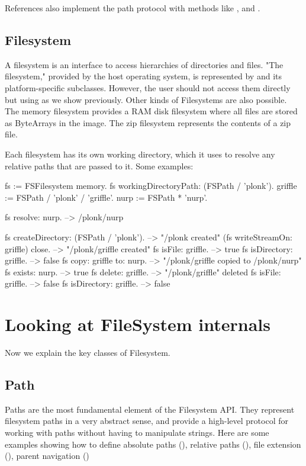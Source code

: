 \documentclass[a4paper,10pt,twoside]{book}
\begin{document}
References also implement the path protocol with methods like \ct{/},  and .


\subsection{Filesystem}

A filesystem is an interface to access hierarchies of directories and files. "The filesystem," provided by the host operating system, is represented by  and its platform-specific subclasses. However, the user should not access them directly but using  as we show previously. Other kinds of Filesystems are also possible. The memory filesystem provides a RAM disk filesystem where all files are stored as ByteArrays in the image. The zip filesystem represents the contents of a zip file.

Each filesystem has its own working directory, which it uses to resolve any relative paths that are passed to it. Some examples:

\begin{code}{}
fs := FSFilesystem memory.
fs workingDirectoryPath: (FSPath / 'plonk').
griffle := FSPath / 'plonk' / 'griffle'.
nurp := FSPath * 'nurp'.
    
fs resolve: nurp.            --> /plonk/nurp
    
fs createDirectory: (FSPath / 'plonk').  --> "/plonk created"
(fs writeStreamOn: griffle) close.  --> "/plonk/griffle created"
fs isFile: griffle.         --> true
fs isDirectory: griffle.         --> false
fs copy: griffle to: nurp.       --> "/plonk/griffle copied to /plonk/nurp"
fs exists: nurp.             --> true
fs delete: griffle.          --> "/plonk/griffle" deleted
fs isFile: griffle.          --> false
fs isDirectory: griffle.         --> false
\end{code}
	



\section{Looking at FileSystem internals}
Now we explain the key classes of Filesystem. 






\subsection{Path}
Paths are the most fundamental element of the Filesystem API. They represent filesystem paths in a very abstract sense, and provide a high-level protocol for working with paths without having to manipulate strings. Here are some examples showing how to 
define absolute paths (), relative paths (), file extension (), parent navigation ()
\end{document}
